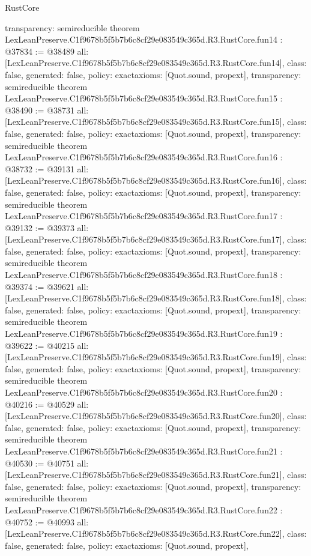 \begin{lexlean}{RustCore}
\begin{coremodule}
{  transparency: semireducible
}
theorem LexLeanPreserve.C1f9678b5f5b7b6c8cf29e083549c365d.R3.RustCore.fun14 : @37834 := @38489 {
  all: [LexLeanPreserve.C1f9678b5f5b7b6c8cf29e083549c365d.R3.RustCore.fun14],
  class: false,
  generated: false,
  policy: exact{axioms: [Quot.sound, propext]},
  transparency: semireducible
}
theorem LexLeanPreserve.C1f9678b5f5b7b6c8cf29e083549c365d.R3.RustCore.fun15 : @38490 := @38731 {
  all: [LexLeanPreserve.C1f9678b5f5b7b6c8cf29e083549c365d.R3.RustCore.fun15],
  class: false,
  generated: false,
  policy: exact{axioms: [Quot.sound, propext]},
  transparency: semireducible
}
theorem LexLeanPreserve.C1f9678b5f5b7b6c8cf29e083549c365d.R3.RustCore.fun16 : @38732 := @39131 {
  all: [LexLeanPreserve.C1f9678b5f5b7b6c8cf29e083549c365d.R3.RustCore.fun16],
  class: false,
  generated: false,
  policy: exact{axioms: [Quot.sound, propext]},
  transparency: semireducible
}
theorem LexLeanPreserve.C1f9678b5f5b7b6c8cf29e083549c365d.R3.RustCore.fun17 : @39132 := @39373 {
  all: [LexLeanPreserve.C1f9678b5f5b7b6c8cf29e083549c365d.R3.RustCore.fun17],
  class: false,
  generated: false,
  policy: exact{axioms: [Quot.sound, propext]},
  transparency: semireducible
}
theorem LexLeanPreserve.C1f9678b5f5b7b6c8cf29e083549c365d.R3.RustCore.fun18 : @39374 := @39621 {
  all: [LexLeanPreserve.C1f9678b5f5b7b6c8cf29e083549c365d.R3.RustCore.fun18],
  class: false,
  generated: false,
  policy: exact{axioms: [Quot.sound, propext]},
  transparency: semireducible
}
theorem LexLeanPreserve.C1f9678b5f5b7b6c8cf29e083549c365d.R3.RustCore.fun19 : @39622 := @40215 {
  all: [LexLeanPreserve.C1f9678b5f5b7b6c8cf29e083549c365d.R3.RustCore.fun19],
  class: false,
  generated: false,
  policy: exact{axioms: [Quot.sound, propext]},
  transparency: semireducible
}
theorem LexLeanPreserve.C1f9678b5f5b7b6c8cf29e083549c365d.R3.RustCore.fun20 : @40216 := @40529 {
  all: [LexLeanPreserve.C1f9678b5f5b7b6c8cf29e083549c365d.R3.RustCore.fun20],
  class: false,
  generated: false,
  policy: exact{axioms: [Quot.sound, propext]},
  transparency: semireducible
}
theorem LexLeanPreserve.C1f9678b5f5b7b6c8cf29e083549c365d.R3.RustCore.fun21 : @40530 := @40751 {
  all: [LexLeanPreserve.C1f9678b5f5b7b6c8cf29e083549c365d.R3.RustCore.fun21],
  class: false,
  generated: false,
  policy: exact{axioms: [Quot.sound, propext]},
  transparency: semireducible
}
theorem LexLeanPreserve.C1f9678b5f5b7b6c8cf29e083549c365d.R3.RustCore.fun22 : @40752 := @40993 {
  all: [LexLeanPreserve.C1f9678b5f5b7b6c8cf29e083549c365d.R3.RustCore.fun22],
  class: false,
  generated: false,
  policy: exact{axioms: [Quot.sound, propext]},
}
\end{coremodule}
\end{lexlean}
